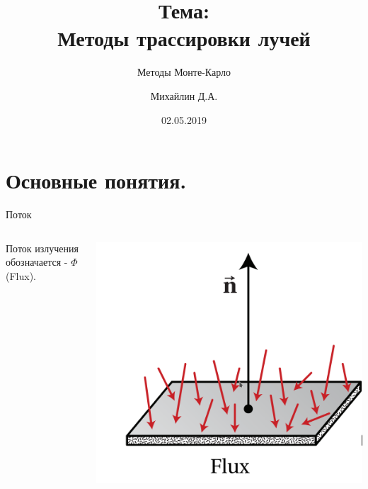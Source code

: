 \documentclass{beamer}
\title{Тема: \\ Методы трассировки лучей }
\subtitle{Методы Монте-Карло}
\author{Михайлин Д.А.}
\date{02.05.2019}
\begin{document}

\begin{frame}
	\maketitle 
\end{frame}


\section{Основные понятия.} %


\begin{frame}{Поток}
	\begin{columns}
			Поток излучения обозначается - $\Phi$(Flux). 
		
			\includegraphics[width=\linewidth]{Flux.png}
	\end{columns}
\end{frame}
\end{document}
